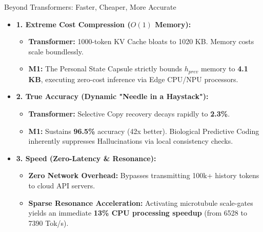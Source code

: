 ﻿\documentclass[aspectratio=169, 10pt]{beamer}
\begin{document}
\begin{frame}{Beyond Transformers: Faster, Cheaper, More Accurate}
\begin{itemize}
    \item \textbf{1. Extreme Cost Compression ($O(1)$ Memory):}
    \begin{itemize}
        \item \textbf{Transformer:} 1000-token KV Cache bloats to 1020 KB. Memory costs scale boundlessly.
        \item \textbf{M1:} The Personal State Capsule strictly bounds $h_{prev}$ memory to \textbf{4.1 KB}, executing zero-cost inference via Edge CPU/NPU processors.
    \end{itemize}
    \vspace{0.5em}
    \item \textbf{2. True Accuracy (Dynamic "Needle in a Haystack"):}
    \begin{itemize}
        \item \textbf{Transformer:} Selective Copy recovery decays rapidly to \textbf{2.3\%}.
        \item \textbf{M1:} Sustains \textbf{96.5\%} accuracy (42x better). Biological Predictive Coding inherently suppresses Hallucinations via local consistency checks.
    \end{itemize}
    \vspace{0.5em}
    \item \textbf{3. Speed (Zero-Latency \& Resonance):}
    \begin{itemize}
        \item \textbf{Zero Network Overhead:} Bypasses transmitting 100k+ history tokens to cloud API servers.
        \item \textbf{Sparse Resonance Acceleration:} Activating microtubule scale-gates yields an immediate \textbf{13\% CPU processing speedup} (from 6528 to 7390 Tok/s).
    \end{itemize}
\end{itemize}
\end{frame}
\end{document}
